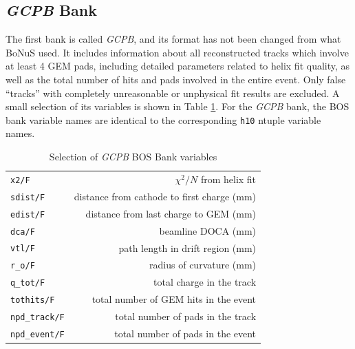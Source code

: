\documentclass[amsmath,amssymb,notitlepage,12pt]{revtex4-1}
\begin{document}
\subsection{{\it GCPB} Bank}
The first bank is called {\it GCPB}, and its format has not been changed from what BoNuS used.  It includes information about all reconstructed tracks which involve at least 4 GEM pads, including detailed parameters related to helix fit quality, as well as the total number of hits and pads involved in the entire event.  Only false ``tracks'' with completely unreasonable or unphysical fit results are excluded.  A small selection of its variables is shown in Table \ref{tab:gcpbbank}.  For the {\it GCPB} bank, the BOS bank variable names are identical to the corresponding \texttt{h10} ntuple variable names.
\begin{table}[thpb]
    \caption{\label{tab:gcpbbank}Selection of {\it GCPB} BOS Bank variables}
    \begin{tabular}{p{4cm}r}
    \toprule[1.5pt]
    \texttt{x2/F}          & $\chi^2/N$ from helix fit \\
    \texttt{sdist/F}       & distance from cathode to first charge (mm)\\
    \texttt{edist/F}       & distance from last charge to GEM (mm)\\
    \texttt{dca/F}         & beamline DOCA (mm)\\
    \texttt{vtl/F}         & path length in drift region (mm)\\
    \texttt{r\_o/F}        & radius of curvature (mm)\\
    \texttt{q\_tot/F}      & total charge in the track\\
    \texttt{tothits/F}     & total number of GEM hits in the event\\
    \texttt{npd\_track/F}  & total number of pads in the track\\
    \texttt{npd\_event/F}  & total number of pads in the event\\
    \bottomrule[1.5pt]
\end{tabular}
\end{table}
\end{document}
